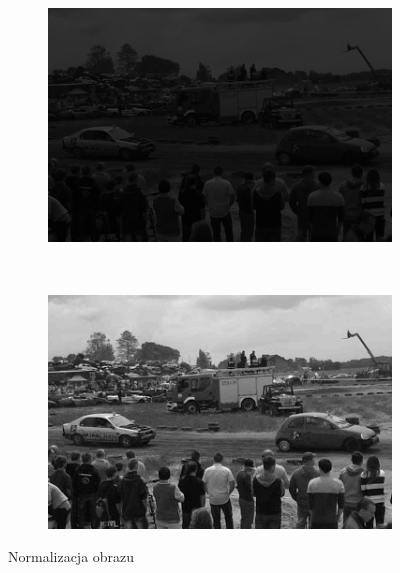 \begin{figure}
  \centering
  \begin{subfigure}[b]{0.45\textwidth}
    \includegraphics[width=\textwidth]{img/image-normalize-before}
    \label{fig:image_normalize_before}
  \end{subfigure}
  ~
  \begin{subfigure}[b]{0.45\textwidth}
    \includegraphics[width=\textwidth]{img/image-normalize-after}
    \label{fig:image_normalize_after}
  \end{subfigure}
  \caption{Normalizacja obrazu}
  \label{fig:image_normalize}
\end{figure}

